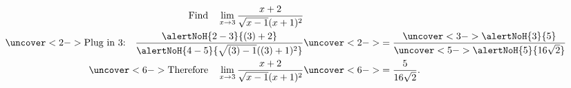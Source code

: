 \begin{frame}
\begin{example}%
\abovedisplayskip=0pt
\belowdisplayskip=-15pt
\abovedisplayshortskip=0pt
\belowdisplayshortskip=0pt
\begin{align*}
\text{Find}\quad \lim_{x\to 3}
\frac%
{x+2}%
{\sqrt{x-1}(x+1)^2}%
& \\%
\uncover<2->{%
\text{Plug in 3:}\quad%
\frac%
{\alertNoH{ 2-3}{(3)+2}}%
{\alertNoH{ 4-5}{\sqrt{(3)-1}((3)+1)^2}}%
}%
& \uncover<2->{%
= \frac%
{\uncover<3->{\alertNoH{ 3}{5}}}%
{\uncover<5->{\alertNoH{ 5}{16\sqrt{2}}}}%
}\\%
\uncover<6->{%
\text{Therefore}\quad \lim_{x\to 3}\frac{x+2}{\sqrt{x-1}(x+1)^2}%
}%
& \uncover<6->{%
= \frac{5}{16\sqrt{2}}.}%
\end{align*}
\end{example}
\end{frame}
